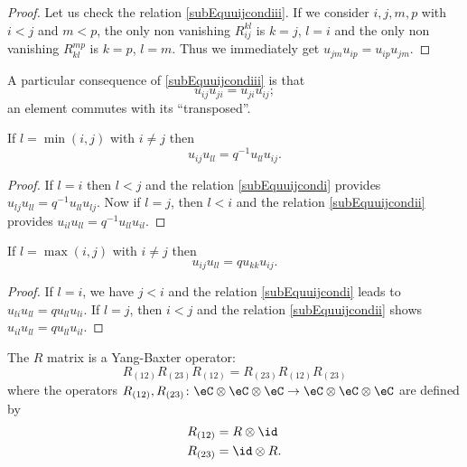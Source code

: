 \begin{proof}
    Let us check the relation \eqref{subEquuijcondiii}. If we consider \( i,j,m,p\) with \( i<j\) and \( m<p\), the only non vanishing \( R^{kl}_{ij}\) is \( k=j\), \( l=i\) and the only non vanishing \( R^{mp}_{kl}\) is \( k=p\), \( l=m\). Thus we immediately get \( u_{jm}u_{ip}=u_{ip}u_{jm}\).
\end{proof}


A particular consequence of \eqref{subEquuijcondiii} is that
\begin{equation}
    u_{ij}u_{ji}=u_{ji}u_{ij};
\end{equation}
an element commutes with its ``transposed''.

\begin{lemma}       \label{lestmunijdiff}
    If $l=\min(i,j)$ with $i\neq j$ then
    \begin{equation}
        u_{ij}u_{ll}=q^{-1}u_{ll}u_{ij}.
    \end{equation}    
\end{lemma}

\begin{proof}
    If $l=i$ then $l<j$ and the relation \eqref{subEquuijcondi} provides $u_{lj}u_{ll}=q^{-1}u_{ll}u_{lj}$. Now if $l=j$, then $l<i$ and the relation \eqref{subEquuijcondii} provides $u_{il}u_{ll}=q^{-1}u_{ll}u_{il}$.
\end{proof}


\begin{lemma}       \label{lestmaxjdiff}
    If $l=\max(i,j)$ with $i\neq j$ then
    \begin{equation}
        u_{ij}u_{ll}=qu_{kk}u_{ij}.
    \end{equation}
\end{lemma}

\begin{proof}
    If $l=i$, we have $j<i$ and the relation \eqref{subEquuijcondi} leads to $u_{li}u_{ll}=qu_{ll}u_{li}$. If $l=j$, then $i<j$ and the relation \eqref{subEquuijcondii} shows $u_{il}u_{ll}=qu_{ll}u_{il}$.
\end{proof}


The $R$ matrix is a Yang-Baxter operator:
\begin{equation}
    R_{(12)}R_{(23)}R_{(12)}=R_{(23)}R_{(12)}R_{(23)}
\end{equation}
where the operators $R_{(12)},R_{(23)}\colon \eC\otimes\eC\otimes\eC\to \eC\otimes\eC\otimes\eC$ are defined by
\begin{equation}
    \begin{aligned}[]
        R_{(12)}&=R\otimes \id\\
        R_{(23)}&=\id\otimes R.
    \end{aligned}
\end{equation}

